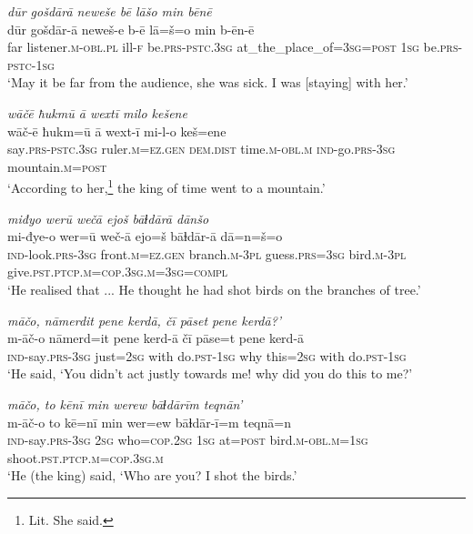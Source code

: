 \ea \label{KŠ.2}
\textit{dūr gošdārā neweše bē lāšo min bēnē} \\ 
\gll dūr gošdār-ā neweš-e b-ē lā=š=o min b-ēn-ē \\ 
 far listener\textsc{.m}\textsc{-obl}\textsc{.pl} ill\textsc{-f} be\textsc{.prs}\textsc{-pstc}\textsc{.3sg} at\_the\_place\_of\textsc{=3sg}\textsc{=\textsc{post}} \textsc{1sg} be\textsc{.prs}\textsc{-pstc}\textsc{-\textsc{1sg}} \\ 
\glt `May it be far from the audience, she was sick. I was [staying] with her.'
\z 
 
\ea \label{KŠ.3}
\textit{wāčē ħukmū ā wextī milo kešene} \\ 
\gll wāč-ē ħukm=ū ā wext-ī mi-l-o keš=ene \\ 
 say\textsc{.prs}\textsc{-pstc}\textsc{.3sg} ruler\textsc{.m}\textsc{=ez.gen} \textsc{dem.dist} time\textsc{.m}\textsc{-obl}\textsc{.m} \textsc{ind-}go\textsc{.prs}\textsc{-3sg} mountain\textsc{.m}\textsc{=\textsc{post}} \\ 
\glt `According to her,\footnote{Lit. She said.} the king of time went to a mountain.'
\z 
 
\ea \label{KŠ.5}
\textit{miđyo werū wečā ejoš bāɫdārā dānšo} \\ 
\gll mi-đye-o wer=ū weč-ā ejo=š bāɫdār-ā dā=n=š=o \\ 
 \textsc{ind-}look\textsc{.prs}\textsc{-3sg} front\textsc{.m}\textsc{=ez.gen} branch\textsc{.m}\textsc{-3pl} guess\textsc{.prs}\textsc{=3sg} bird\textsc{.m}\textsc{-3pl} give\textsc{.pst}\textsc{.ptcp}\textsc{.m}\textsc{=cop}\textsc{.3sg}\textsc{.m}\textsc{=3sg}\textsc{=compl} \\ 
\glt `He realised that ... He thought he had shot birds on the branches of tree.'
\z 
 
\ea \label{KŠ.9}
\textit{māčo, nāmerdit pene kerdā, čī pāset pene kerdā?’} \\ 
\gll m-āč-o nāmerd=it pene kerd-ā čī pāse=t pene kerd-ā \\ 
 \textsc{ind-}say\textsc{.prs}\textsc{-3sg} just\textsc{=\textsc{2sg}} with do\textsc{.pst}\textsc{-\textsc{1sg}} why this\textsc{=\textsc{2sg}} with do\textsc{.pst}\textsc{-\textsc{1sg}} \\ 
\glt `He said, ‘You didn’t act justly towards me! why did you do this to me?'
\z 
 
\ea \label{KŠ.10}
\textit{māčo, to kēnī min werew bāɫdārīm teqnān’} \\ 
\gll m-āč-o to kē=nī min wer=ew bāɫdār-ī=m teqnā=n \\ 
 \textsc{ind-}say\textsc{.prs}\textsc{-3sg} \textsc{2sg} who\textsc{=cop}\textsc{.\textsc{2sg}} \textsc{1sg} at\textsc{=\textsc{post}} bird\textsc{.m}\textsc{-obl}\textsc{.m}\textsc{=\textsc{1sg}} shoot\textsc{.pst}\textsc{.ptcp}\textsc{.m}\textsc{=cop}\textsc{.3sg}\textsc{.m} \\ 
\glt `He (the king) said, ‘Who are you? I shot the birds.'
\z 
 
